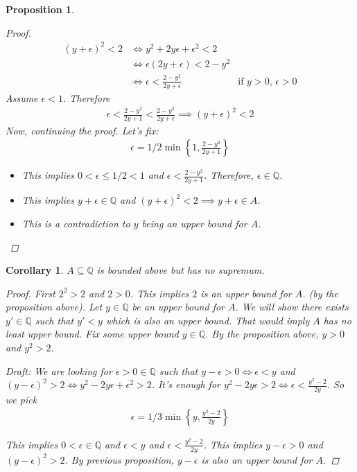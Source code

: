 \documentclass[10pt]{article}
\newcommand{\Q}{\mathbb{Q}}
\newtheorem{corollary}[theorem]{Corollary}
\newtheorem{proposition}[theorem]{Proposition}
\theoremstyle{definition}
\theoremstyle{remark}
\begin{document}
\begin{proposition}
\begin{proof}
        \begin{align*}
            (y + \epsilon)^2 < 2 &\iff y^2 + 2y\epsilon + \epsilon^2 < 2 \\
                                 &\iff \epsilon(2y + \epsilon) < 2 - y^2 \\
                                 &\iff \epsilon < \frac{2 - y^2}{2y + \epsilon} &\text{if $y>0$, $\epsilon > 0$}
        \end{align*}
        Assume $\epsilon < 1$. Therefore
        \begin{align*}
            \epsilon < \frac{2 - y^2}{2y + 1} < \frac{2 - y^2}{2y + \epsilon} \implies (y + \epsilon)^2 < 2
        \end{align*}
        Now, continuing the proof. Let's fix:
        \begin{align*}
            \epsilon = 1/2 \min\left\{1, \frac{2 - y^2}{2y + 1}\right\}
        \end{align*}
        \begin{itemize}
            \item
        This implies $0 < \epsilon \leq 1/2 < 1$ and $\epsilon < \frac{2 - y^2}{2y + 1}$.
        Therefore, $\epsilon \in \Q$.
            \item
        This implies $y+ \epsilon \in \Q$ and $(y + \epsilon)^2 < 2 \implies y + \epsilon \in A$.
            \item
        This is a contradiction to $y$ being an upper bound for $A$.
        \end{itemize}
    \end{proof}
\end{proposition}

\begin{corollary}
    $A \subseteq \Q$ is bounded above but has no supremum.
    \begin{proof}
        First $2^2 > 2$ and $2 > 0$. This implies $2$ is an upper bound for $A$. (by the proposition above).
        Let $y \in \Q$ be an upper bound for $A$. We will show there exists $y' \in \Q$ such that $y' < y$ which is also an upper bound. That would imply $A$ has no least upper bound.
        Fix some upper bound $y \in \Q$. By the proposition above, $y > 0$ and $y^2 > 2$.

        Draft: We are looking for $\epsilon > 0 \in \Q$ such that $y - \epsilon > 0 \iff \epsilon < y$ and $(y - \epsilon)^2 > 2 \iff y^2 - 2y\epsilon + \epsilon^2 > 2$.
        It's enough for $y^2 - 2y\epsilon > 2 \iff \epsilon < \frac{y^2 - 2}{2y}$. So we pick
        \begin{align*}
            \epsilon = 1/3 \min\left\{y, \frac{y^2 - 2}{2y}\right\}
        \end{align*}

        This implies $0 < \epsilon \in \Q$ and $\epsilon < y$ and $\epsilon < \frac{y^2 - 2}{2y}$.
        This implies $y - \epsilon > 0$ and $(y - \epsilon)^2 > 2$. By previous proposition, $y - \epsilon$ is also an upper bound for $A$.
    \end{proof}
\end{corollary}
\end{document}
